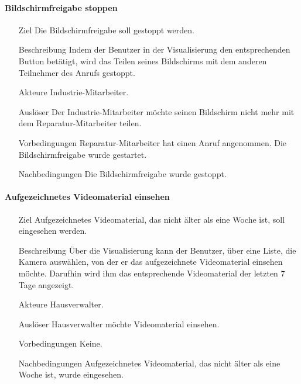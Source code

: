 \paragraph{Bildschirmfreigabe stoppen}
    \begin{itemize}
        \item[Ziel]
        Die Bildschirmfreigabe soll gestoppt werden.
        \item[Beschreibung]
        Indem der Benutzer in der Visualisierung den entsprechenden Button betätigt, wird das Teilen seines Bildschirms mit dem anderen Teilnehmer des Anrufs gestoppt.
        \item[Akteure]
        Industrie-Mitarbeiter.
        \item[Auslöser]
        Der Industrie-Mitarbeiter möchte seinen Bildschirm nicht mehr mit dem Reparatur-Mitarbeiter teilen.
        \item[Vorbedingungen]
        Reparatur-Mitarbeiter hat einen Anruf angenommen.
        Die Bildschirmfreigabe wurde gestartet.
        \item[Nachbedingungen]
        Die Bildschirmfreigabe wurde gestoppt.
        \end{itemize}

\paragraph{Aufgezeichnetes Videomaterial einsehen}
    \begin{itemize}
        \item[Ziel]
        Aufgezeichnetes Videomaterial, das nicht älter als eine Woche ist, soll eingesehen werden.
        \item[Beschreibung]
        Über die Visualisierung kann der Benutzer, über eine Liste, die Kamera auswählen, von der er das aufgezeichnete Videomaterial einsehen möchte.
        Darufhin wird ihm das entsprechende Videomaterial der letzten 7 Tage angezeigt.
        \item[Akteure]
        Hausverwalter.
        \item[Auslöser]
        Hausverwalter möchte Videomaterial einsehen.
        \item[Vorbedingungen]
        Keine.
        \item[Nachbedingungen]
        Aufgezeichnetes Videomaterial, das nicht älter als eine Woche ist, wurde eingesehen.
        \end{itemize}   
